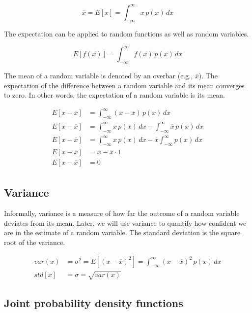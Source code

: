 \begin{equation*}
  \overline{x} = E[x] = \int_{-\infty}^\infty x \,p(x) \,dx
\end{equation*}

The expectation can be applied to random functions as well as random variables.

\begin{equation*}
  E[f(x)] = \int_{-\infty}^\infty f(x) \,p(x) \,dx
\end{equation*}

The mean of a random variable is denoted by an overbar (e.g., $\overline{x}$).
The expectation of the difference between a random variable and its mean
converges to zero. In other words, the expectation of a random variable is its
mean.

\begin{align*}
  E[x - \overline{x}] &= \int_{-\infty}^\infty (x - \overline{x}) \,p(x) \,dx \\
  E[x - \overline{x}] &= \int_{-\infty}^\infty x \, p(x) \,dx -
    \int_{-\infty}^\infty \overline{x} \,p(x) \,dx \\
  E[x - \overline{x}] &= \int_{-\infty}^\infty x \,p(x) \,dx -
    \overline{x} \int_{-\infty}^\infty p(x) \,dx \\
  E[x - \overline{x}] &= \overline{x} - \overline{x} \cdot 1 \\
  E[x - \overline{x}] &= 0 \\
\end{align*}

\subsection{Variance}

Informally, variance is a measure of how far the outcome of a random variable
deviates from its mean. Later, we will use variance to quantify how confident we
are in the estimate of a random variable. The standard deviation is the square
root of the variance.

\begin{align*}
  var(x) &= \sigma^2 = E[(x - \overline{x})^2] =
    \int_{-\infty}^{\infty} (x - \overline{x})^2 \,p(x) \,dx \\
  std[x] &= \sigma = \sqrt{var(x)}
\end{align*}

\subsection{Joint probability density functions}

